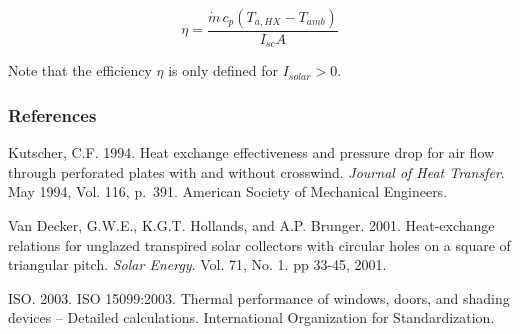 \begin{equation}
\eta  = \frac{{\dot m\,{c_p}\left( {{T_{a,HX}} - {T_{amb}}} \right)}}{{{I_{sc}}A}}
\end{equation}

Note that the efficiency \(\eta\) is only defined for \({I_{solar}} > 0\).

\subsubsection{References}\label{references-3-004}

Kutscher, C.F. 1994. Heat exchange effectiveness and pressure drop for air flow through perforated plates with and without crosswind. \emph{Journal of Heat Transfer}. May 1994, Vol. 116, p.~391. American Society of Mechanical Engineers.

Van Decker, G.W.E., K.G.T. Hollands, and A.P. Brunger. 2001. Heat-exchange relations for unglazed transpired solar collectors with circular holes on a square of triangular pitch. \emph{Solar Energy}. Vol. 71, No. 1. pp 33-45, 2001.

ISO. 2003. ISO 15099:2003. Thermal performance of windows, doors, and shading devices -- Detailed calculations. International Organization for Standardization.
